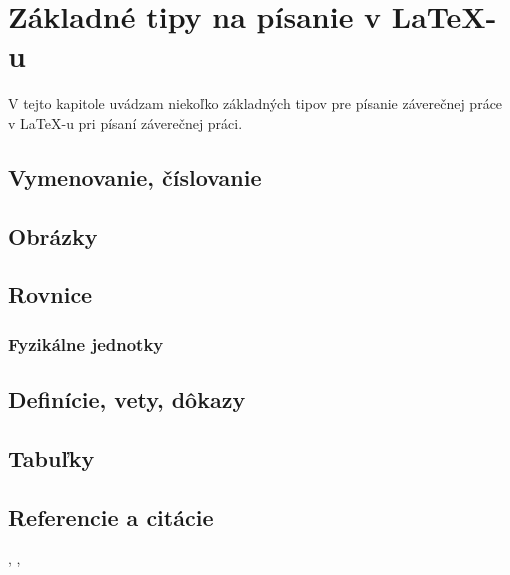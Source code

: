 \chapter{Základné tipy na písanie v \LaTeX-u}
\label{tipy}

V tejto kapitole uvádzam niekoľko základných tipov pre písanie záverečnej práce v \LaTeX-u pri písaní záverečnej práci. 

\section{Vymenovanie, číslovanie}

\section{Obrázky}

\section{Rovnice}

\subsection{Fyzikálne jednotky}

\section{Definície, vety, dôkazy}

\section{Tabuľky}

\section{Referencie a citácie}

\cite{Handlovicova,mikulaRemesikovaSarkoci2014}, \cite{eymard}, \cite{obrazok}
